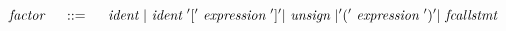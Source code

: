 \[
	~\emph{factor}~ \quad ::= \quad
		~\emph{ident}~ | ~\emph{ident}~ '[' ~\emph{expression}~ ']' | ~\emph{unsign}~ |
			'(' ~\emph{expression}~ ')' | ~\emph{fcallstmt}~
\]

